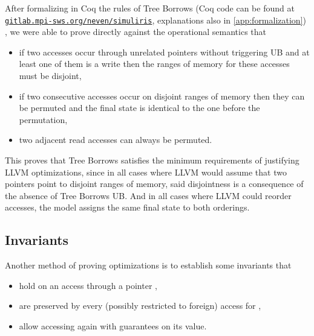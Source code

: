 \documentclass[a4paper,11pt]{article}
\theoremstyle{plain}
\theoremstyle{definition}
\theoremstyle{remark}
\newcommand{\tcode}[1]{\rstinline{#1}}
\begin{document}
After formalizing in Coq the rules of Tree Borrows (Coq code can be found at\\
\href{https://gitlab.mpi-sws.org/neven/simuliris/-/tree/master/theories/tree_borrows}{\texttt{gitlab.mpi-sws.org/neven/simuliris}},
explanations also in \ref{app:formalization})
, we were able to prove directly against the operational semantics that
\begin{itemize}
    \item if two accesses occur through unrelated pointers without triggering UB and at least one of
        them is a write then the ranges of memory for these accesses must be disjoint,
    \item if two consecutive accesses occur on disjoint ranges of memory then they can be permuted
        and the final state is identical to the one before the permutation,
    \item two adjacent read accesses can always be permuted.
\end{itemize}

This proves that Tree Borrows satisfies the minimum requirements of justifying LLVM
optimizations, since in all cases where LLVM would assume that two pointers point
to disjoint ranges of memory, said disjointness is a consequence of the absence of
Tree Borrows UB. And in all cases where LLVM could reorder accesses, the model
assigns the same final state to both orderings.


\subsection{Invariants}

Another method of proving optimizations is to establish some invariants that
\begin{itemize}
    \item hold on an access through a pointer \tcode{x},
    \item are preserved by every (possibly restricted to foreign) access for \tcode{x},
    \item allow accessing \tcode{x} again with guarantees on its value.
\end{itemize}
\end{document}
